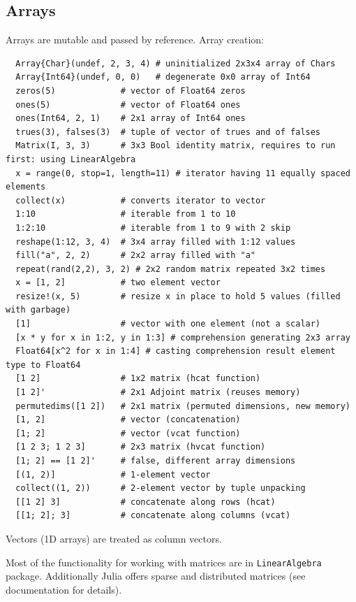 \documentclass[10pt,a4paper]{article}
\begin{document}
\subsection{Arrays}
Arrays are mutable and passed by reference.
Array creation:
\begin{lstlisting}
  Array{Char}(undef, 2, 3, 4) # uninitialized 2x3x4 array of Chars
  Array{Int64}(undef, 0, 0)   # degenerate 0x0 array of Int64
  zeros(5)             # vector of Float64 zeros
  ones(5)              # vector of Float64 ones
  ones(Int64, 2, 1)    # 2x1 array of Int64 ones
  trues(3), falses(3)  # tuple of vector of trues and of falses
  Matrix(I, 3, 3)      # 3x3 Bool identity matrix, requires to run first: using LinearAlgebra
  x = range(0, stop=1, length=11) # iterator having 11 equally spaced elements
  collect(x)           # converts iterator to vector
  1:10                 # iterable from 1 to 10
  1:2:10               # iterable from 1 to 9 with 2 skip
  reshape(1:12, 3, 4)  # 3x4 array filled with 1:12 values
  fill("a", 2, 2)      # 2x2 array filled with "a"
  repeat(rand(2,2), 3, 2) # 2x2 random matrix repeated 3x2 times
  x = [1, 2]           # two element vector
  resize!(x, 5)        # resize x in place to hold 5 values (filled with garbage)
  [1]                  # vector with one element (not a scalar)
  [x * y for x in 1:2, y in 1:3] # comprehension generating 2x3 array
  Float64[x^2 for x in 1:4] # casting comprehension result element type to Float64
  [1 2]                # 1x2 matrix (hcat function)
  [1 2]'               # 2x1 Adjoint matrix (reuses memory)
  permutedims([1 2])   # 2x1 matrix (permuted dimensions, new memory)
  [1, 2]               # vector (concatenation)
  [1; 2]               # vector (vcat function)
  [1 2 3; 1 2 3]       # 2x3 matrix (hvcat function)
  [1; 2] == [1 2]'     # false, different array dimensions
  [(1, 2)]             # 1-element vector
  collect((1, 2))      # 2-element vector by tuple unpacking
  [[1 2] 3]            # concatenate along rows (hcat)
  [[1; 2]; 3]          # concatenate along columns (vcat)
\end{lstlisting}
Vectors (1D arrays) are treated as column vectors.

Most of the functionality for working with matrices are in \lstinline|LinearAlgebra| package.
Additionally Julia offers sparse and distributed matrices (see documentation for details).
\end{document}
